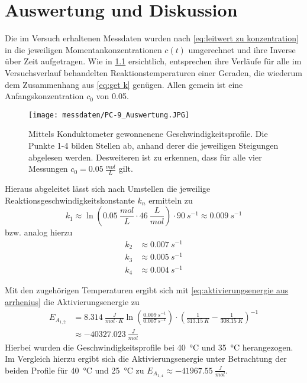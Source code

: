 \chapter{Auswertung und Diskussion}
	Die im Versuch erhaltenen Messdaten wurden nach \cref{eq:leitwert zu konzentration} in die jeweiligen Momentankonzentrationen \(c(t)\)
	umgerechnet und ihre Inverse über Zeit aufgetragen. Wie in \cref{fig:messdaten} ersichtlich, entsprechen ihre Verläufe für
	alle im Versuchsverlauf behandelten Reaktionstemperaturen einer Geraden, die wiederum dem Zusammenhang aus \cref{eq:get k}
	genügen. Allen gemein ist eine Anfangskonzentration \(c_0\) von \SI{0,05}{}.
	\begin{figure}[h]
		\centering
		\texttt{[image: messdaten/PC-9\_Auswertung.JPG]}
		\caption{Mittels Konduktometer gewonnenene Geschwindigkeitsprofile. Die Punkte 1-4 bilden Stellen ab, anhand derer die jeweiligen Steigungen abgelesen werden. Desweiteren ist zu erkennen,
		dass für alle vier Messungen \(c_0 = \SI{0,05}{\frac{mol}{L}}\) gilt.}
		\label{fig:messdaten}
	\end{figure}

	Hieraus abgeleitet lässt sich nach Umstellen die jeweilige Reaktionsgeschwindigkeitskonstante \(k_n\) ermitteln zu
	\begin{equation}
		k_1 \approx \ln \left(\SI{0,05}{\frac{mol}{L}} \cdot \SI{46}{\frac{L}{mol}}\right) \cdot \SI{90}{s^{-1}} \approx \SI{0,009}{s^{-1}}
		\label{eq:get real k}
	\end{equation}
	bzw. analog hierzu
	\begin{align}
		k_2 &\approx \SI{0,007}{s^{-1}} \nonumber \\
		k_3 &\approx \SI{0,005}{s^{-1}} \nonumber \\
		k_4 &\approx \SI{0,004}{s^{-1}} \nonumber
	\end{align}

	Mit den zugehörigen Temperaturen ergibt sich mit \cref{eq:aktivierungsenergie aus arrhenius} die Aktivierungsenergie
	zu
	\begin{align}
		E_{A_{1,2}} &= \SI{8,314}{\frac{J}{mol \cdot K}} \ln\left(\frac{\SI{0,009}{s^{-1}}}{\SI{0,007}{s^{-1}}}\right) \cdot \left( \frac{1}{\SI{313,15}{K}} - \frac{1}{\SI{308,15}{K}}\right)^{-1} \nonumber \\
			&\approx \SI{-40327,023}{\frac{J}{mol}}
		\label{eq:aktivierungsenergie for real}
	\end{align}
	Hierbei wurden die Geschwindigkeitsprofile bei \SI{40}{\celsius} und \SI{35}{\celsius} herangezogen.
	Im Vergleich hierzu ergibt sich die Aktivierungsenergie unter Betrachtung der beiden Profile für \SI{40}{\celsius} und \SI{25}{\celsius}
	zu \(E_{A_{1,4}} \approx \SI{-41967,55}{\frac{J}{mol}}\).

